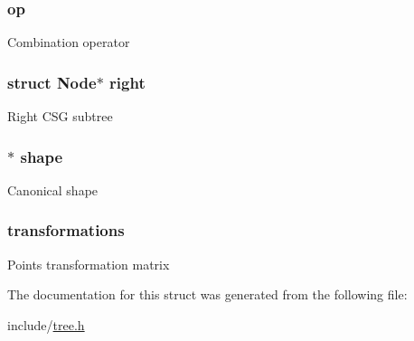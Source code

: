 \subsubsection[{\texorpdfstring{op}{op}}]{ op}\hypertarget{struct_node_a2a8ef6b2c643a5bc2991ec125cbdb700}{}\label{struct_node_a2a8ef6b2c643a5bc2991ec125cbdb700}
Combination operator 
\subsubsection[{\texorpdfstring{right}{right}}]{\setlength{\rightskip}{0pt plus 5cm}struct {\bf Node}$\ast$ right}\hypertarget{struct_node_a760682e46f54442d313a05d18095b52f}{}\label{struct_node_a760682e46f54442d313a05d18095b52f}
Right C\+SG subtree 
\subsubsection[{\texorpdfstring{shape}{shape}}]{$\ast$ shape}\hypertarget{struct_node_a3f409da58d3391e8f33c69cce5e4044f}{}\label{struct_node_a3f409da58d3391e8f33c69cce5e4044f}
Canonical shape 
\subsubsection[{\texorpdfstring{transformations}{transformations}}]{ transformations}\hypertarget{struct_node_aaeb58d722bd66bac7f6f6b4d715ba4c2}{}\label{struct_node_aaeb58d722bd66bac7f6f6b4d715ba4c2}
Points transformation matrix 

The documentation for this struct was generated from the following file\+:\begin{DoxyCompactItemize}
\item 
include/\hyperlink{tree_8h}{tree.\+h}\end{DoxyCompactItemize}
